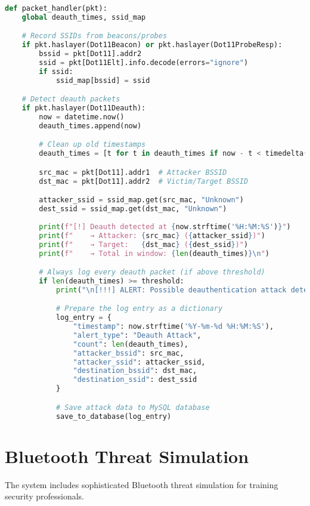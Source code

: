 \documentclass[12pt,a4paper]{report}
\begin{document}
\begin{lstlisting}[language=Python,caption={Real Deauth Detection Implementation}]
def packet_handler(pkt):
    global deauth_times, ssid_map

    # Record SSIDs from beacons/probes
    if pkt.haslayer(Dot11Beacon) or pkt.haslayer(Dot11ProbeResp):
        bssid = pkt[Dot11].addr2
        ssid = pkt[Dot11Elt].info.decode(errors="ignore")
        if ssid:
            ssid_map[bssid] = ssid

    # Detect deauth packets
    if pkt.haslayer(Dot11Deauth):
        now = datetime.now()
        deauth_times.append(now)

        # Clean up old timestamps
        deauth_times = [t for t in deauth_times if now - t < timedelta(seconds=time_window)]

        src_mac = pkt[Dot11].addr1  # Attacker BSSID
        dst_mac = pkt[Dot11].addr2  # Victim/Target BSSID

        attacker_ssid = ssid_map.get(src_mac, "Unknown")
        dest_ssid = ssid_map.get(dst_mac, "Unknown")
        
        print(f"[!] Deauth detected at {now.strftime('%H:%M:%S')}")
        print(f"    → Attacker: {src_mac} ({attacker_ssid})")
        print(f"    → Target:   {dst_mac} ({dest_ssid})")
        print(f"    → Total in window: {len(deauth_times)}\n")

        # Always log every deauth packet (if above threshold)
        if len(deauth_times) >= threshold:
            print("\n[!!!] ALERT: Possible deauthentication attack detected!\n")

            # Prepare the log entry as a dictionary
            log_entry = {
                "timestamp": now.strftime('%Y-%m-%d %H:%M:%S'),
                "alert_type": "Deauth Attack",
                "count": len(deauth_times),
                "attacker_bssid": src_mac,
                "attacker_ssid": attacker_ssid,
                "destination_bssid": dst_mac,
                "destination_ssid": dest_ssid
            }

            # Save attack data to MySQL database
            save_to_database(log_entry)
\end{lstlisting}

\section{Bluetooth Threat Simulation}

The system includes sophisticated Bluetooth threat simulation for training security professionals.
\end{document}
